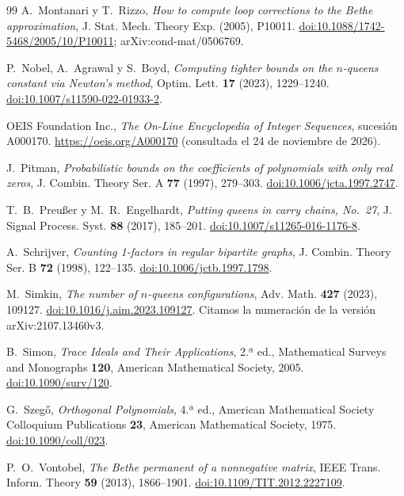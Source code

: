 \begin{thebibliography}{99}
 A.~Montanari y T.~Rizzo, \emph{How to compute loop corrections to the
Bethe approximation}, J. Stat. Mech. Theory Exp. (2005), P10011.
\href{https://doi.org/10.1088/1742-5468/2005/10/P10011}{doi:10.1088/1742-5468/2005/10/P10011};
arXiv:cond-mat/0506769.

 P.~Nobel, A.~Agrawal y S.~Boyd, \emph{Computing tighter bounds on the $n$-queens
constant via Newton's method}, Optim. Lett. \textbf{17} (2023), 1229--1240.
\href{https://doi.org/10.1007/s11590-022-01933-2}{doi:10.1007/s11590-022-01933-2}.

 OEIS Foundation Inc., \emph{The On-Line Encyclopedia of Integer Sequences},
sucesión A000170. \url{https://oeis.org/A000170} (consultada el 24 de noviembre de 2026).

 J.~Pitman, \emph{Probabilistic bounds on the coefficients of polynomials with only
real zeros}, J. Combin. Theory Ser. A \textbf{77} (1997), 279--303.
\href{https://doi.org/10.1006/jcta.1997.2747}{doi:10.1006/jcta.1997.2747}.

 T.~B.~Preußer y M.~R.~Engelhardt, \emph{Putting queens in carry chains, No.~27}, J. Signal
Process. Syst. \textbf{88} (2017), 185--201.
\href{https://doi.org/10.1007/s11265-016-1176-8}{doi:10.1007/s11265-016-1176-8}.

 A.~Schrijver, \emph{Counting 1-factors in regular bipartite graphs},
J. Combin. Theory Ser. B \textbf{72} (1998), 122--135.
\href{https://doi.org/10.1006/jctb.1997.1798}{doi:10.1006/jctb.1997.1798}.

 M.~Simkin, \emph{The number of $n$-queens configurations}, Adv. Math.
\textbf{427} (2023), 109127.
\href{https://doi.org/10.1016/j.aim.2023.109127}{doi:10.1016/j.aim.2023.109127}. Citamos la numeración de
la versión arXiv:2107.13460v3.

 B.~Simon, \emph{Trace Ideals and Their Applications}, 2.ª ed., Mathematical Surveys
and Monographs \textbf{120}, American Mathematical Society, 2005.
\href{https://doi.org/10.1090/surv/120}{doi:10.1090/surv/120}.

 G.~Szegő, \emph{Orthogonal Polynomials}, 4.ª ed., American Mathematical Society Colloquium
Publications \textbf{23}, American Mathematical Society, 1975.
\href{https://doi.org/10.1090/coll/023}{doi:10.1090/coll/023}.

 P.~O.~Vontobel, \emph{The Bethe permanent of a nonnegative matrix}, IEEE Trans.
Inform. Theory \textbf{59} (2013), 1866--1901.
\href{https://doi.org/10.1109/TIT.2012.2227109}{doi:10.1109/TIT.2012.2227109}.


\end{thebibliography}
